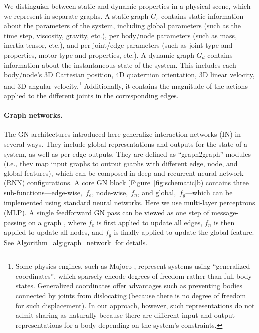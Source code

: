\documentclass{article}
\begin{document}


We distinguish between static and dynamic properties in a physical scene, which we represent in separate graphs. A static graph $G_s$ contains static information about the parameters of the system, including global parameters (such as the time step, viscosity, gravity, etc.), per body/node parameters (such as mass, inertia tensor, etc.), and per joint/edge parameters (such as joint type and properties, motor type and properties, etc.).
%
A dynamic graph $G_d$ contains information about the instantaneous state of the system. This includes each body/node's 3D Cartesian position, 4D quaternion orientation, 3D linear velocity, and 3D angular velocity.\footnote{Some physics engines, such as Mujoco \cite{todorov2012mujoco}, represent systems using ``generalized coordinates'', which sparsely encode degrees of freedom rather than full body states. Generalized coordinates offer advantages such as preventing bodies connected by joints from dislocating (because there is no degree of freedom for such displacement). In our approach, however, such representations do not admit sharing as naturally because there are different input and output representations for a body depending on the system's constraints.}
%
Additionally, it contains the magnitude of the actions applied to the different joints in the corresponding edges. 


\paragraph{Graph networks.}
The GN architectures introduced here generalize interaction networks (IN) \cite{battaglia2016interaction} in several ways. They include global representations and outputs for the state of a system, as well as per-edge outputs. They are defined as ``graph2graph'' modules (i.e., they map input graphs to output graphs with different edge, node, and global features), which can be composed in deep and recurrent neural network (RNN) configurations. A core GN block (Figure~\ref{fig:schematic}b) contains three sub-functions---edge-wise,~$f_e$, node-wise,~$f_n$, and global,~$f_g$---which can be implemented using standard neural networks. Here we use multi-layer perceptrons (MLP). A single feedforward GN pass can be viewed as one step of message-passing on a graph \cite{gilmer2017neural}, where $f_e$ is first applied to update all edges, $f_n$ is then applied to update all nodes, and $f_g$ is finally applied to update the global feature. See Algorithm~\ref{alg:graph_network} for details. 
\end{document}
